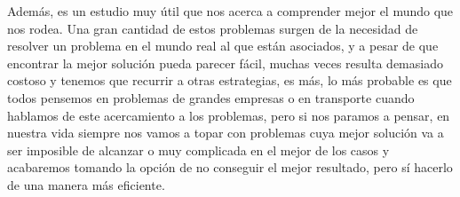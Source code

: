 \documentclass[a4paper,12pt,titlepage]{article}
\begin{document}
Adem\'as, es un estudio muy \'util que nos acerca a comprender mejor el mundo que nos rodea. Una gran cantidad de estos problemas surgen de la necesidad de resolver un problema en el mundo real al que est\'an asociados, y a pesar de que encontrar la mejor soluci\'on pueda parecer f\'acil, muchas veces resulta demasiado costoso y tenemos que recurrir a otras estrategias, es m\'as, lo m\'as probable es que todos pensemos en problemas de grandes empresas o en transporte cuando hablamos de este acercamiento a los problemas, pero si nos paramos a pensar, en nuestra vida siempre nos vamos a topar con problemas cuya mejor soluci\'on va a ser imposible de alcanzar o muy complicada en el mejor de los casos y acabaremos tomando la opci\'on de no conseguir el mejor resultado, pero s\'i hacerlo de una manera m\'as eficiente.

\newpage



\end{document}
